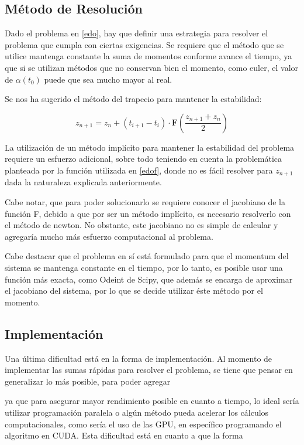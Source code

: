 \documentclass[letter, 10pt]{article}
\begin{document}
\subsection{Método de Resolución}

Dado el problema en \ref{edo}, hay que definir una estrategia para resolver el problema que cumpla con ciertas exigencias. Se requiere que el método que se utilice mantenga constante la suma de momentos conforme avance el tiempo, ya que si se utilizan métodos que no conservan bien el momento, como euler, el valor de $\alpha(t_0)$ puede que sea mucho mayor al real.

Se nos ha sugerido el método del trapecio para mantener la estabilidad:

\begin{equation}
z_{n+1} = z_n + (t_{i+1} - t_i) \cdot \mathbf{F}\left(\frac{z_{n+1} + z_n}{2}\right)
\end{equation}

La utilización de un método implícito para mantener la estabilidad del problema requiere un esfuerzo adicional, sobre todo teniendo en cuenta la problemática planteada por la función utilizada en \ref{edof}, donde no es fácil resolver para $z_{n+1}$ dada la naturaleza explicada anteriormente.

Cabe notar, que para poder solucionarlo se requiere conocer el jacobiano de la función F, debido a que por ser un método implícito, es necesario resolverlo con el método de newton. No obstante, este jacobiano no es simple de calcular y agregaría mucho más esfuerzo computacional al problema.

Cabe destacar que el problema en sí está formulado para que el momentum del sistema se mantenga constante en el tiempo, por lo tanto, es posible usar una función más exacta, como Odeint de Scipy, que además se encarga de aproximar el jacobiano del sistema, por lo que se decide utilizar éste método por el momento.


\subsection{Implementación}
Una última dificultad está en la forma de implementación. Al momento de implementar las sumas rápidas para resolver el problema, se tiene que pensar en generalizar lo más posible, para poder agregar 

ya que para asegurar mayor rendimiento posible en cuanto a tiempo, lo ideal sería utilizar programación paralela o algún método pueda acelerar los cálculos computacionales, como sería el uso de las GPU, en específico programando el algoritmo en CUDA. Esta dificultad está en cuanto a que la forma
\end{document}
